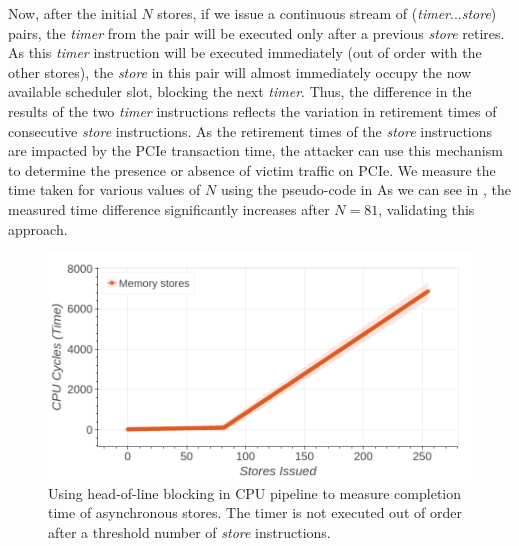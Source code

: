 Now, after the initial $N$ stores, if we issue a continuous stream of (\textit{timer}...\textit{store}) pairs, the \textit{timer} from the pair will be executed only after a previous \textit{store} retires.
As this \textit{timer} instruction will be executed immediately (out of order with the other stores), the \textit{store} in this pair will almost immediately occupy the now available scheduler slot, blocking the next \textit{timer}.
Thus, the difference in the results of the two \textit{timer} instructions reflects the variation in retirement times of consecutive \textit{store} instructions.
As the retirement times of the \textit{store} instructions are impacted by the PCIe transaction time, the attacker can use this mechanism to determine the presence or absence of victim traffic on PCIe.
We measure the time taken for various values of $N$ using the pseudo-code in 
As we can see in , the measured time difference significantly increases after $N = 81$, validating this approach.



\begin{figure}[!htb]
    \centering
    \includegraphics[width=\columnwidth]{figures/interconnect-sc/store-ops/measuring_store_time.png}
    \caption{Using head-of-line blocking in CPU pipeline to measure completion time of asynchronous stores.
    The timer is not executed out of order after a threshold number of \textit{store} instructions.}
    \label{fig:measuring-store-time}
\end{figure}

